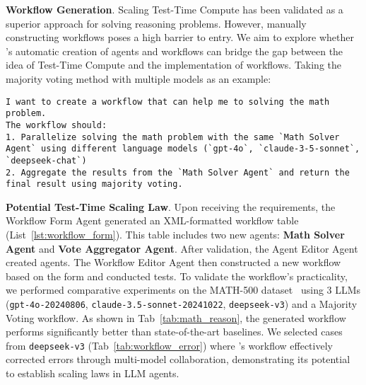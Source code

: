 \noindent \textbf{Workflow Generation}. Scaling Test-Time Compute has been validated as a superior approach for solving reasoning problems. However, manually constructing workflows poses a high barrier to entry. We aim to explore whether \model's automatic creation of agents and workflows can bridge the gap between the idea of Test-Time Compute and the implementation of workflows. Taking the majority voting method with multiple models as an example:
\begin{lstlisting}[basicstyle=\ttfamily\footnotesize, frame=none, columns=fullflexible, breaklines=true, breakatwhitespace=true, breakindent=3pt]
I want to create a workflow that can help me to solving the math problem.
The workflow should:
1. Parallelize solving the math problem with the same `Math Solver Agent` using different language models (`gpt-4o`, `claude-3-5-sonnet`, `deepseek-chat`)
2. Aggregate the results from the `Math Solver Agent` and return the final result using majority voting.
\end{lstlisting}
\begin{table}[t]
\vspace{-.5em}
\centering
\caption{Comparison between single LLMs and the AI-generated Majority Voting workflow.
}\label{tab:math_reason}
\vspace{-0.1in}
\end{table}

\noindent \textbf{Potential Test-Time Scaling Law}. Upon receiving the requirements, the Workflow Form Agent generated an XML-formatted workflow table (List~\ref{lst:workflow_form}). This table includes two new agents: \textbf{Math Solver Agent} and \textbf{Vote Aggregator Agent}. After validation, the Agent Editor Agent created agents. The Workflow Editor Agent then constructed a new workflow based on the form and conducted tests. To validate the workflow's practicality, we performed comparative experiments on the MATH-500 dataset~\cite{math500} using 3 LLMs (\texttt{gpt-4o-20240806}, \texttt{claude-3.5-sonnet-20241022}, \texttt{deepseek-v3}) and a Majority Voting workflow. As shown in Tab~\ref{tab:math_reason}, the generated workflow performs significantly better than state-of-the-art baselines. We selected cases from \texttt{deepseek-v3} (Tab~\ref{tab:workflow_error}) where \model's workflow effectively corrected errors through multi-model collaboration, demonstrating its potential to establish scaling laws in LLM agents.




